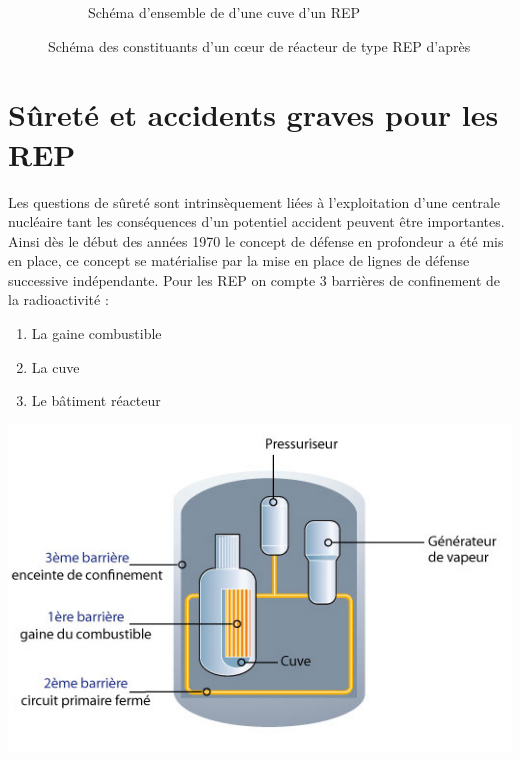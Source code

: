 \documentclass[a4paper,11pt,fleqn]{report}    %
\begin{document}
\begin{figure}[H]
\begin{subfigure}[t]{0.45\textwidth}
     	\caption{Schéma d'ensemble de d'une cuve d'un REP}
     	\label{subfig:example-image-c}
    	 \end{subfigure}
	     \caption{Schéma des constituants d'un c\oe ur de réacteur de type REP d'après \cite{ clement_les_2020} }
	     \label{fig:test_subfigure}
	\end{figure}
\section{Sûreté et accidents graves pour les REP}
Les questions de sûreté sont intrinsèquement liées à l'exploitation d'une centrale nucléaire tant les conséquences d'un potentiel accident peuvent être importantes. Ainsi dès le début des années 1970 le concept de défense en profondeur a été mis en place, ce concept se matérialise par la mise en place de lignes de défense successive indépendante. Pour les REP on compte 3 barrières de confinement de la radioactivité :
 \\
\begin{minipage}[c]{0.3\linewidth}
	\begin{enumerate}
		\item La gaine combustible
		\item La cuve
		\item Le bâtiment réacteur
	\end{enumerate}
\end{minipage} \hfill
\begin{minipage}[c]{0.65\linewidth}
	\centering
	\includegraphics[width=0.7\linewidth]{figure/irsn_barriere-confinement.png}
\end{minipage}
\vspace{0.5cm}
\end{document}
